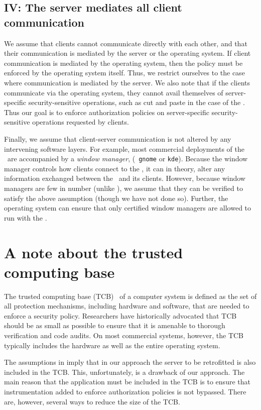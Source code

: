 \subsection*{IV: The server mediates all client communication}
%
We assume that clients cannot communicate directly with each other, and that
their communication is mediated by the server or the operating system.  If
client communication is mediated by the operating system, then the policy must
be enforced by the operating system itself. Thus, we restrict ourselves to the
case where communication is mediated by the server. We also note that if the
clients communicate via the operating system, they cannot avail themselves of
server-specific security-sensitive operations, such as cut and paste in the
case of the \xserver.  Thus our goal is to enforce authorization policies on
server-specific security-sensitive operations requested by clients.

Finally, we assume that client-server communication is not altered by any
intervening software layers. For example, most commercial deployments of the
\xserver\ are accompanied by a \textit{window manager}, (\eg~\texttt{gnome} or
\texttt{kde}). Because the window manager controls how clients connect to the
\xserver, it can in theory, alter any information exchanged between the
\xserver\ and its clients. However, because window managers are few in number
(unlike \xclients), we assume that they can be verified to satisfy the above
assumption (though we have not done so).  Further, the operating system can
ensure that only certified window managers are allowed to run with the
\xserver.

\section{A note about the trusted computing base}
\label{chapter:overview:tcb}
%
The trusted computing base (TCB)~\cite{tcsec} of a computer system is defined
as the set of all protection mechanisms, including hardware and software, that
are needed to enforce a security policy. Researchers have historically
advocated that TCB should be as small as possible to ensure that it is amenable
to thorough verification and code audits. On most commercial systems, however,
the TCB typically includes the hardware as well as the entire operating system.

The assumptions in  imply that in our
approach the server to be retrofitted is also included in the TCB. This,
unfortunately, is a drawback of our approach. The main reason that the
application must be included in the TCB is to ensure that instrumentation added
to enforce authorization policies is not bypassed. There are, however, several
ways to reduce the size of the TCB. 

